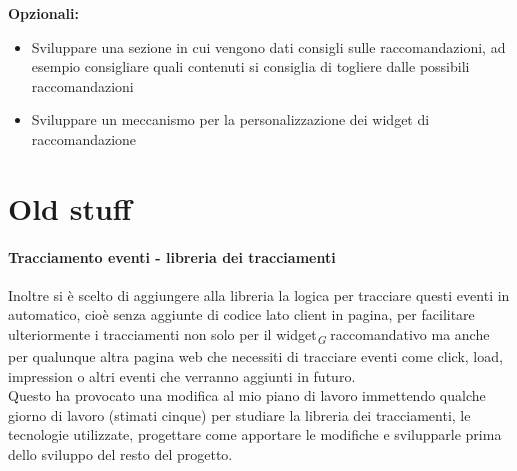\documentclass[a4paper, 12pt, twoside, openright]{book}
\newcommand{\gloss}[1]{#1\textsubscript{\textit{\tiny{G}}}}
\begin{document}
\textbf{Opzionali:}
\begin{itemize}
	\item Sviluppare una sezione in cui vengono dati consigli sulle raccomandazioni, ad esempio consigliare quali contenuti si consiglia di togliere dalle possibili raccomandazioni
	\item Sviluppare un meccanismo per la personalizzazione dei widget di raccomandazione
\end{itemize}








\chapter{Old stuff}
\subsubsection{Tracciamento eventi - libreria dei tracciamenti}
Inoltre si è scelto di aggiungere alla libreria la logica per tracciare questi eventi in automatico, cioè senza aggiunte di codice lato client in pagina, per facilitare ulteriormente i tracciamenti non solo per il \gloss{widget} raccomandativo ma anche per qualunque altra pagina web che necessiti di tracciare eventi come click, load, impression o altri eventi che verranno aggiunti in futuro.\\
Questo ha provocato una modifica al mio piano di lavoro immettendo qualche giorno di lavoro (stimati cinque) per studiare la libreria dei tracciamenti, le tecnologie utilizzate, progettare come apportare le modifiche e svilupparle prima dello sviluppo del resto del progetto.\\
\end{document}
